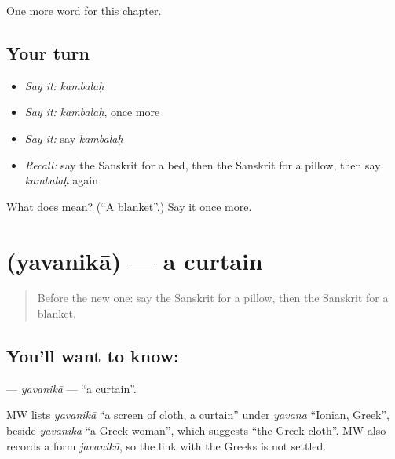 \begin{grammarlens}[title={What you've built}]
One more word for this chapter.
\end{grammarlens}

\subsection*{Your turn}
\begin{itemize}
\raggedright
  \item \emph{Say it:} \emph{kambalaḥ}
  \item \emph{Say it:} \emph{kambalaḥ}, once more
  \item \emph{Say it:} say \emph{kambalaḥ}
  \item \emph{Recall:} say the Sanskrit for a bed, then the Sanskrit for a pillow, then say \emph{kambalaḥ} again
\end{itemize}

\begin{tcolorbox}[breakable,colback=teal!4,colframe=teal!35!black,title={Before you move on}]
What does  mean? (\textquotedblleft{}A blanket\textquotedblright{}.) Say it once more.
\end{tcolorbox}
\section[\texorpdfstring{\sk{यवनिका} (yavanikā)}{यवनिका (yavanikā)}]{ (yavanikā) — a curtain}

\label{lesson:SA-C99-yavanika}



\begin{quote}
Before the new one: say the Sanskrit for a pillow, then the Sanskrit for a blanket.
\end{quote}

\subsection*{You'll want to know: }
\textbf{} — \emph{yavanikā} — \textquotedblleft{}a curtain\textquotedblright{}.

\begin{cousinweb}
MW lists \emph{yavanikā} \textquotedblleft{}a screen of cloth, a curtain\textquotedblright{} under \emph{yavana} \textquotedblleft{}Ionian, Greek\textquotedblright{}, beside \emph{yavanikā} \textquotedblleft{}a Greek woman\textquotedblright{}, which suggests \textquotedblleft{}the Greek cloth\textquotedblright{}. MW also records a form \emph{javanikā}, so the link with the Greeks is not settled.
\end{cousinweb}

